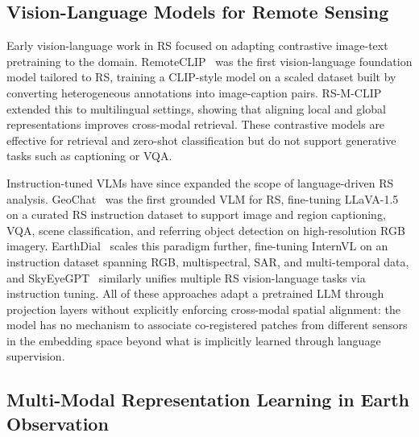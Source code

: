 \subsection{Vision-Language Models for Remote Sensing}
\label{sec:chap6_rw_vlm}

Early vision-language work in RS focused on adapting contrastive
image-text pretraining to the domain. RemoteCLIP~\cite{liu2024remoteclip}
was the first vision-language foundation model tailored to RS, training
a CLIP-style model on a scaled dataset built by converting heterogeneous
annotations into image-caption pairs. RS-M-CLIP~\cite{silva2024rsmclip}
extended this to multilingual settings, showing that aligning local and
global representations improves cross-modal retrieval. These contrastive
models are effective for retrieval and zero-shot classification but do
not support generative tasks such as captioning or VQA.

Instruction-tuned VLMs have since expanded the scope of language-driven
RS analysis. GeoChat~\cite{kuckreja2024geochat} was the first grounded
VLM for RS, fine-tuning LLaVA-1.5 on a curated RS instruction dataset to
support image and region captioning, VQA, scene classification, and
referring object detection on high-resolution RGB imagery. EarthDial~\cite{soni2025earthdialturningmultisensoryearth}
scales this paradigm further, fine-tuning InternVL on an
instruction dataset spanning RGB, multispectral, SAR, and multi-temporal
data, and SkyEyeGPT~\cite{zhan2025skyeyegpt} similarly unifies multiple
RS vision-language tasks via instruction tuning. All of these approaches
adapt a pretrained LLM through projection layers without explicitly
enforcing cross-modal spatial alignment: the model has no mechanism to
associate co-registered patches from different sensors in the embedding
space beyond what is implicitly learned through language supervision.

\subsection{Multi-Modal Representation Learning in Earth Observation}
\label{sec:chap6_rw_ssl}

